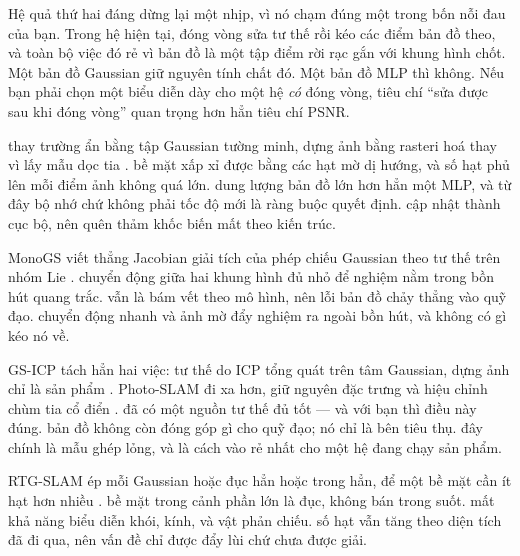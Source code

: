 \documentclass[../../deep_learning.tex]{subfiles}
\begin{document}
Hệ quả thứ hai đáng dừng lại một nhịp, vì nó chạm đúng một trong bốn nỗi đau của bạn. Trong hệ hiện tại, đóng vòng sửa tư thế rồi kéo các điểm bản đồ theo, và toàn bộ việc đó rẻ vì bản đồ là một tập điểm rời rạc gắn với khung hình chốt. Một bản đồ Gaussian giữ nguyên tính chất đó. Một bản đồ MLP thì không. Nếu bạn phải chọn một biểu diễn dày cho một hệ \emph{có} đóng vòng, tiêu chí ``sửa được sau khi đóng vòng'' quan trọng hơn hẳn tiêu chí PSNR.

\begin{mach}
\item {}
\gp thay trường ẩn bằng tập Gaussian tường minh, dựng ảnh bằng rasteri hoá thay vì lấy mẫu dọc tia \cite{kerbl20233dgs}.
\gd bề mặt xấp xỉ được bằng các hạt mờ dị hướng, và số hạt phủ lên mỗi điểm ảnh không quá lớn.
\gia dung lượng bản đồ lớn hơn hẳn một MLP, và từ đây bộ nhớ chứ không phải tốc độ mới là ràng buộc quyết định.
\hq cập nhật thành cục bộ, nên quên thảm khốc biến mất theo kiến trúc.

\item {}
\gp MonoGS viết thẳng Jacobian giải tích của phép chiếu Gaussian theo tư thế trên nhóm Lie \cite{f32monogs2024}.
\gd chuyển động giữa hai khung hình đủ nhỏ để nghiệm nằm trong bồn hút quang trắc.
\gia vẫn là bám vết theo mô hình, nên lỗi bản đồ chảy thẳng vào quỹ đạo.
\vdm chuyển động nhanh và ảnh mờ đẩy nghiệm ra ngoài bồn hút, và không có gì kéo nó về.

\item {}
\gp GS-ICP tách hẳn hai việc: tư thế do ICP tổng quát trên tâm Gaussian, dựng ảnh chỉ là sản phẩm \cite{f32gsicp2024}. Photo-SLAM đi xa hơn, giữ nguyên đặc trưng và hiệu chỉnh chùm tia cổ điển \cite{f32photoslam2024}.
\gd đã có một nguồn tư thế đủ tốt --- và với bạn thì điều này đúng.
\gia bản đồ không còn đóng góp gì cho quỹ đạo; nó chỉ là bên tiêu thụ.
\hq đây chính là mẫu ghép lỏng, và là cách vào rẻ nhất cho một hệ đang chạy sản phẩm.

\item {}
\gp RTG-SLAM ép mỗi Gaussian hoặc đục hẳn hoặc trong hẳn, để một bề mặt cần ít hạt hơn nhiều \cite{f32rtgslam2024}.
\gd bề mặt trong cảnh phần lớn là đục, không bán trong suốt.
\gia mất khả năng biểu diễn khói, kính, và vật phản chiếu.
\vdm số hạt vẫn tăng theo diện tích đã đi qua, nên vấn đề chỉ được đẩy lùi chứ chưa được giải.
\end{mach}
\end{document}
